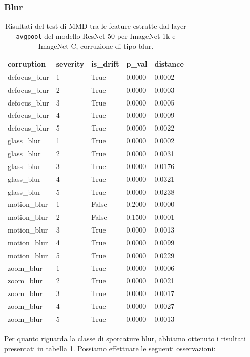 \subsubsection{Blur}
\begin{table}[H]
  \centering
  \begin{tabular}{lllll}
    \toprule
    corruption & severity & is\_drift & p\_val & distance \\
    \midrule
    defocus\_blur & 1 & True & 0.0000 & 0.0002 \\ 
    defocus\_blur & 2 & True & 0.0000 & 0.0003 \\ 
    defocus\_blur & 3 & True & 0.0000 & 0.0005 \\ 
    defocus\_blur & 4 & True & 0.0000 & 0.0009 \\ 
    defocus\_blur & 5 & True & 0.0000 & 0.0022 \\ 
    glass\_blur & 1 & True & 0.0000 & 0.0002 \\ 
    glass\_blur & 2 & True & 0.0000 & 0.0031 \\ 
    glass\_blur & 3 & True & 0.0000 & 0.0176 \\ 
    glass\_blur & 4 & True & 0.0000 & 0.0321 \\ 
    glass\_blur & 5 & True & 0.0000 & 0.0238 \\ 
    motion\_blur & 1 & False & 0.2000 & 0.0000 \\ 
    motion\_blur & 2 & False & 0.1500 & 0.0001 \\ 
    motion\_blur & 3 & True & 0.0000 & 0.0013 \\ 
    motion\_blur & 4 & True & 0.0000 & 0.0099 \\ 
    motion\_blur & 5 & True & 0.0000 & 0.0229 \\ 
    zoom\_blur & 1 & True & 0.0000 & 0.0006 \\ 
    zoom\_blur & 2 & True & 0.0000 & 0.0021 \\ 
    zoom\_blur & 3 & True & 0.0000 & 0.0017 \\ 
    zoom\_blur & 4 & True & 0.0000 & 0.0027 \\ 
    zoom\_blur & 5 & True & 0.0000 & 0.0013 \\ 
    \bottomrule
  \end{tabular}
\caption{Risultati del test di MMD tra le feature estratte dal layer \texttt{avgpool} del modello ResNet-50 per ImageNet-1k e ImageNet-C, corruzione di tipo blur.}
\label{tab:mmd_drift_report_imagenet_c_blur}
\end{table}
Per quanto riguarda la classe di sporcature blur, abbiamo ottenuto i risultati presentati in tabella \ref{tab:mmd_drift_report_imagenet_c_blur}. Possiamo effettuare le seguenti osservazioni:
